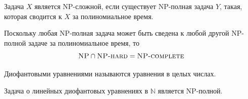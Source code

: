     
    
    \begin{Def}
         Задача $X$ является \textsc{NP}-сложной, если существует \textsc{NP}-полная задача $Y$, такая, которая сводится к $X$ за полиномиальное время.
    \end{Def}
    \begin{Rem}
        Поскольку любая \textsc{NP}-полная задача может быть сведена к любой другой \textsc{NP}-полной задаче за полиномиальное время, то
        \[\textsc{NP} \cap \textsc{NP-hard} = \textsc{NP-complete}\]
    \end{Rem}
    \begin{Def}
        Диофантовыми уравнениями называются уравнения в целых числах.
    \end{Def}
    \begin{Thm}
        Задача о линейных диофантовых уравнениях в $\mathbb{N}$ является \textsc{NP}-полной.
    \end{Thm}

    
    
